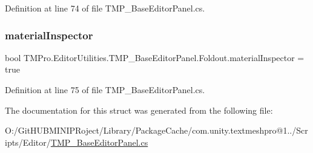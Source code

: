 Definition at line 74 of file T\+M\+P\+\_\+\+Base\+Editor\+Panel.\+cs.

\mbox{\label{struct_t_m_pro_1_1_editor_utilities_1_1_t_m_p___base_editor_panel_1_1_foldout_adce2deb9f23313e580f181894a2c5ee6}} 
\subsubsection{\texorpdfstring{materialInspector}{materialInspector}}
{\footnotesize\ttfamily bool T\+M\+Pro.\+Editor\+Utilities.\+T\+M\+P\+\_\+\+Base\+Editor\+Panel.\+Foldout.\+material\+Inspector = true\hspace{0.3cm}{\ttfamily [static]}}



Definition at line 75 of file T\+M\+P\+\_\+\+Base\+Editor\+Panel.\+cs.



The documentation for this struct was generated from the following file\+:\begin{DoxyCompactItemize}
\item 
O\+:/\+Git\+H\+U\+B\+M\+I\+N\+I\+P\+Roject/\+Library/\+Package\+Cache/com.\+unity.\+textmeshpro@1../\+Scripts/\+Editor/\mbox{\hyperlink{_t_m_p___base_editor_panel_8cs}{T\+M\+P\+\_\+\+Base\+Editor\+Panel.\+cs}}\end{DoxyCompactItemize}
